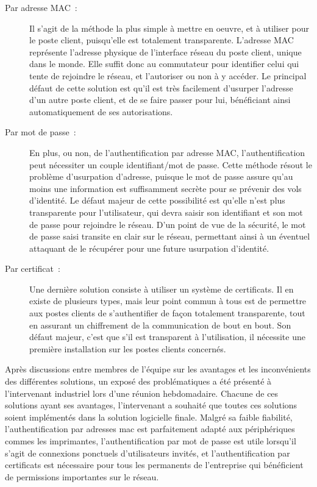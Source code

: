 \begin{description}
\item[Par adresse MAC~:] Il s'agit de la méthode la plus simple à mettre en oeuvre, et à utiliser pour le poste client, puisqu'elle est totalement transparente. L'adresse MAC représente l'adresse physique de l'interface réseau du poste client, unique dans le monde. Elle suffit donc au commutateur pour identifier celui qui tente de rejoindre le réseau, et l'autoriser ou non à y accéder. Le principal défaut de cette solution est qu'il est très facilement d'usurper l'adresse d'un autre poste client, et de se faire passer pour lui, bénéficiant ainsi automatiquement de ses autorisations.
\item[Par mot de passe~:] En plus, ou non, de l'authentification par adresse MAC, l'authentification peut nécessiter un couple identifiant/mot de passe. Cette méthode résout le problème d'usurpation d'adresse, puisque le mot de passe assure qu'au moins une information est suffisamment secrète pour se prévenir des vols d'identité. Le défaut majeur de cette possibilité est qu'elle n'est plus transparente pour l'utilisateur, qui devra saisir son identifiant et son mot de passe pour rejoindre le réseau. D'un point de vue de la sécurité, le mot de passe saisi transite en clair sur le réseau, permettant ainsi à un éventuel attaquant de le récupérer pour une future usurpation d'identité.
\item[Par certificat~:] Une dernière solution consiste à utiliser un système de certificats. Il en existe de plusieurs types, mais leur point commun à tous est de permettre aux postes clients de s'authentifier de façon totalement transparente, tout en assurant un chiffrement de la communication de bout en bout. Son défaut majeur, c'est que s'il est transparent à l'utilisation, il nécessite une première installation sur les postes clients concernés.
\end{description}

Après discussions entre membres de l'équipe sur les avantages et les inconvénients des différentes solutions, un exposé des problématiques a été présenté à l'intervenant industriel lors d'une réunion hebdomadaire. Chacune de ces solutions ayant ses avantages, l'intervenant a souhaité que toutes ces solutions soient implémentés dans la solution logicielle finale. Malgré sa faible fiabilité, l'authentification par adresses mac est parfaitement adapté aux périphériques commes les imprimantes, l'authentification par mot de passe est utile lorsqu'il s'agit de connexions ponctuels d'utilisateurs invités, et l'authentification par certificats est nécessaire pour tous les permanents de l'entreprise qui bénéficient de permissions importantes sur le réseau.

